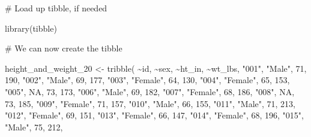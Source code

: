 \documentclass[
  letterpaper,
  DIV=11,
  numbers=noendperiod]{scrreprt}
\newenvironment{Shaded}{\begin{snugshade}}{\end{snugshade}}
\newcommand{\CommentTok}[1]{\textcolor[rgb]{0.37,0.37,0.37}{#1}}
\newcommand{\ConstantTok}[1]{\textcolor[rgb]{0.56,0.35,0.01}{#1}}
\newcommand{\DecValTok}[1]{\textcolor[rgb]{0.68,0.00,0.00}{#1}}
\newcommand{\FunctionTok}[1]{\textcolor[rgb]{0.28,0.35,0.67}{#1}}
\newcommand{\NormalTok}[1]{\textcolor[rgb]{0.00,0.23,0.31}{#1}}
\newcommand{\OtherTok}[1]{\textcolor[rgb]{0.00,0.23,0.31}{#1}}
\newcommand{\SpecialCharTok}[1]{\textcolor[rgb]{0.37,0.37,0.37}{#1}}
\newcommand{\StringTok}[1]{\textcolor[rgb]{0.13,0.47,0.30}{#1}}
\begin{document}
\begin{Shaded}
\begin{Highlighting}[]
\CommentTok{\# Load up tibble, if needed}

\FunctionTok{library}\NormalTok{(tibble)}

\CommentTok{\# We can now create the tibble}

\NormalTok{height\_and\_weight\_20 }\OtherTok{\textless{}{-}} \FunctionTok{tribble}\NormalTok{(}
  \SpecialCharTok{\textasciitilde{}}\NormalTok{id,   }\SpecialCharTok{\textasciitilde{}}\NormalTok{sex,     }\SpecialCharTok{\textasciitilde{}}\NormalTok{ht\_in, }\SpecialCharTok{\textasciitilde{}}\NormalTok{wt\_lbs,}
  \StringTok{"001"}\NormalTok{, }\StringTok{"Male"}\NormalTok{,   }\DecValTok{71}\NormalTok{,     }\DecValTok{190}\NormalTok{,}
  \StringTok{"002"}\NormalTok{, }\StringTok{"Male"}\NormalTok{,   }\DecValTok{69}\NormalTok{,     }\DecValTok{177}\NormalTok{,}
  \StringTok{"003"}\NormalTok{, }\StringTok{"Female"}\NormalTok{, }\DecValTok{64}\NormalTok{,     }\DecValTok{130}\NormalTok{,}
  \StringTok{"004"}\NormalTok{, }\StringTok{"Female"}\NormalTok{, }\DecValTok{65}\NormalTok{,     }\DecValTok{153}\NormalTok{,}
  \StringTok{"005"}\NormalTok{, }\ConstantTok{NA}\NormalTok{,       }\DecValTok{73}\NormalTok{,     }\DecValTok{173}\NormalTok{,}
  \StringTok{"006"}\NormalTok{, }\StringTok{"Male"}\NormalTok{,   }\DecValTok{69}\NormalTok{,     }\DecValTok{182}\NormalTok{,}
  \StringTok{"007"}\NormalTok{, }\StringTok{"Female"}\NormalTok{, }\DecValTok{68}\NormalTok{,     }\DecValTok{186}\NormalTok{,}
  \StringTok{"008"}\NormalTok{, }\ConstantTok{NA}\NormalTok{,       }\DecValTok{73}\NormalTok{,     }\DecValTok{185}\NormalTok{,}
  \StringTok{"009"}\NormalTok{, }\StringTok{"Female"}\NormalTok{, }\DecValTok{71}\NormalTok{,     }\DecValTok{157}\NormalTok{,}
  \StringTok{"010"}\NormalTok{, }\StringTok{"Male"}\NormalTok{,   }\DecValTok{66}\NormalTok{,     }\DecValTok{155}\NormalTok{,}
  \StringTok{"011"}\NormalTok{, }\StringTok{"Male"}\NormalTok{,   }\DecValTok{71}\NormalTok{,     }\DecValTok{213}\NormalTok{,}
  \StringTok{"012"}\NormalTok{, }\StringTok{"Female"}\NormalTok{, }\DecValTok{69}\NormalTok{,     }\DecValTok{151}\NormalTok{,}
  \StringTok{"013"}\NormalTok{, }\StringTok{"Female"}\NormalTok{, }\DecValTok{66}\NormalTok{,     }\DecValTok{147}\NormalTok{,}
  \StringTok{"014"}\NormalTok{, }\StringTok{"Female"}\NormalTok{, }\DecValTok{68}\NormalTok{,     }\DecValTok{196}\NormalTok{,}
  \StringTok{"015"}\NormalTok{, }\StringTok{"Male"}\NormalTok{,   }\DecValTok{75}\NormalTok{,     }\DecValTok{212}\NormalTok{,}

\end{Highlighting}
\end{Shaded}
\end{document}
